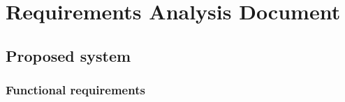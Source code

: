 



\part*{Requirements Analysis Document}













\chapter*{Proposed system}

\section*{Functional requirements}

